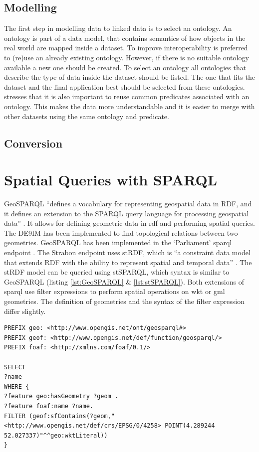 \subsection{Modelling}
The first step in modelling data to linked data is to select an ontology. An ontology is part of a data model, that contains semantics of how objects in the real world are mapped inside a dataset. To improve interoperability is preferred to (re)use an already existing ontology. However, if there is no suitable ontology available a new one should be created. To select an ontology all ontologies that describe the type of data inside the dataset should be listed. The one that fits the dataset and the final application best should be selected from these ontologies. \cite{LD:Missier} stresses that it is also important to reuse common predicates associated with an ontology. This makes the data more understandable and it is easier to merge with other datasets using the same ontology and predicate. 

 
\subsection{Conversion}

\section{Spatial Queries with SPARQL}
\label{par:SpatialFilters}
GeoSPARQL \enquote{defines a vocabulary for representing geospatial data in RDF, and it defines an extension to the SPARQL query language for processing geospatial data} \cite[p. xvi]{LD:OGC}. It allows for defining geometric data in \ac{rdf} and performing spatial queries. The \ac{DE9IM} \citep{GIS:9IM} has been implemented to find topological relations between two geometries. GeoSPARQL has been implemented in the `Parliament' \ac{sparql} endpoint \citep{LD:GeoSPARQL}. The Strabon endpoint uses stRDF, which is \enquote{a constraint data model that extends RDF with the ability to represent spatial and temporal data} \cite[p. 425]{SSW:Koubarakis}. The stRDF model can be queried using stSPARQL, which syntax is similar to GeoSPARQL (listing \ref{lst:GeoSPARQL} \& \ref{lst:stSPARQL}). Both extensions of \ac{sparql} use filter expressions to perform spatial operations on \ac{wkt} or \ac{gml} geometries. The definition of geometries and the syntax of the filter expression differ slightly.

\begin{lstlisting}[caption={A GeoSPARQL query to find the names of features that contain a point geometry}, label={lst:GeoSPARQL}]
PREFIX geo: <http://www.opengis.net/ont/geosparql#>
PREFIX geof: <http://www.opengis.net/def/function/geosparql/>
PREFIX foaf: <http://xmlns.com/foaf/0.1/> 

SELECT 
?name
WHERE {
?feature geo:hasGeometry ?geom .
?feature foaf:name ?name.
FILTER (geof:sfContains(?geom,"<http://www.opengis.net/def/crs/EPSG/0/4258> POINT(4.289244 52.027337)"^^geo:wktLiteral))
}
\end{lstlisting}

